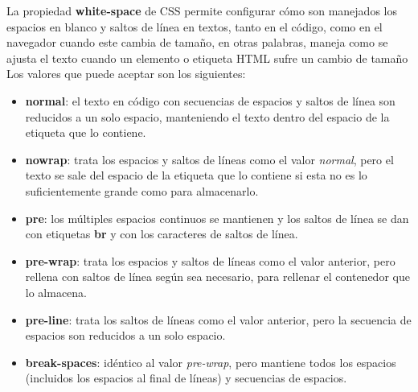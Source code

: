 La propiedad \textbf{white-space} de CSS permite configurar cómo son manejados los espacios en blanco y saltos de línea en textos, tanto en el código, como en el navegador cuando este cambia de tamaño, en otras palabras, maneja como se ajusta el texto cuando un elemento o etiqueta HTML sufre un cambio de tamaño Los valores que puede aceptar son los siguientes:
\begin{itemize}
    \item \textbf{normal}: el texto en código con secuencias de espacios y saltos de línea son reducidos a un solo espacio, manteniendo el texto dentro del espacio de la etiqueta que lo contiene.
    \item \textbf{nowrap}: trata los espacios y saltos de líneas como el valor \textit{normal}, pero el texto se sale del espacio de la etiqueta que lo contiene si esta no es lo suficientemente grande como para almacenarlo.
    \item \textbf{pre}: los múltiples espacios continuos se mantienen y los saltos de línea se dan con etiquetas \textbf{br} y con los caracteres de saltos de línea.
    \item \textbf{pre-wrap}: trata los espacios y saltos de líneas como el valor anterior, pero rellena con saltos de línea según sea necesario, para rellenar el contenedor que lo almacena.
    \item \textbf{pre-line}: trata los saltos de líneas como el valor anterior, pero la secuencia de espacios son reducidos a un solo espacio.
    \item \textbf{break-spaces}: idéntico al valor \textit{pre-wrap}, pero mantiene todos los espacios (incluidos los espacios al final de líneas) y secuencias de espacios.
\end{itemize}

